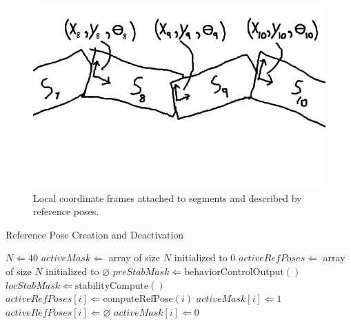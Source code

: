 \begin{figure}
\begin{center}
\includegraphics[scale=0.5]{3_frames_2.png}
\end{center}
\caption{Local coordinate frames attached to segments and described by reference poses.}
\label{frames2}
\end{figure}


\begin{algorithm}
\caption{Reference Pose Creation and Deactivation}          %
\label{alg:reference}
\begin{algorithmic}

\State $N \Leftarrow 40$
\State $activeMask \Leftarrow $ array of size $N$ initialized to $0$
\State $activeRefPoses \Leftarrow $ array of size $N$ initialized to $\varnothing$
\State $preStabMask \Leftarrow \mathrm{behaviorControlOutput}()$
\State $locStabMask \Leftarrow \mathrm{stabilityCompute()}$
\State      $activeRefPoses[i] \Leftarrow \mathrm{computeRefPose}(i)$
\State      $activeMask[i] \Leftarrow 1$
\EndIf
{}
\State    $activeRefPoses[i] \Leftarrow \varnothing$
\State    $activeMask[i] \Leftarrow 0$
\EndIf
\EndFor

\end{algorithmic}
\end{algorithm}

